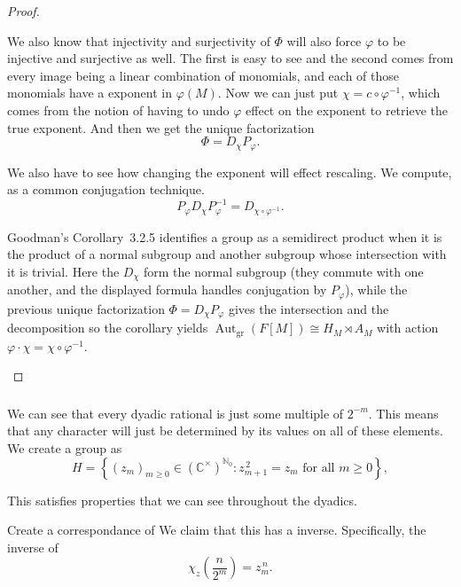 \documentclass[11pt]{scrartcl}
\begin{document}
\begin{soln}
\begin{proof}
\begin{subproof}
			We also know that injectivity and surjectivity of $\Phi$ will also force 
			$\varphi$ to be injective and surjective as well. The first is easy to see
			and the second comes from every image being a linear combination of monomials, and
			each of those monomials have a exponent in  $\varphi(M)$.
            Now we can just put
            $\chi=c\circ\varphi^{-1}$, which comes from the notion 
			of having to undo $\varphi$ effect on the exponent to retrieve 
			the true exponent. And then we get the unique factorization
            \[
            \Phi=D_\chi P_\varphi.
            \]
        \end{subproof}

        \begin{subproof}
			We also have to see how changing the exponent will effect rescaling. 
			We compute, as a common conjugation technique.
			            \[
            P_\varphi D_\chi P_\varphi^{-1}
            =D_{\chi\circ\varphi^{-1}}.
            \]

Goodman's Corollary~3.2.5 \cite{p6-goodman} identifies a
group as a semidirect product when it is the product of
a normal subgroup and another subgroup whose intersection
with it is trivial.
Here the $D_\chi$ form the normal subgroup
(they commute with one another, and the displayed formula
handles conjugation by $P_\varphi$), while the previous
unique factorization $\Phi=D_\chi P_\varphi$ gives the intersection and the decomposition
so  the corollary yields
$\operatorname{Aut}_{\mathrm{gr}}(F[M])\cong H_M\rtimes A_M$
with action $\varphi\cdot\chi=\chi\circ\varphi^{-1}$.
        \end{subproof}
    \end{proof}

    \subsubsection*{}
	We can see that every dyadic rational is just some multiple of  $2^{-m}$.
	This means that any character will just be determined by its values on
	all of these elements. We create a group as 
	    \[
    H=\left\{
        (z_m)_{m\ge0}\in(\mathbb C^\times)^{\mathbb N_0}:
        z_{m+1}^{\,2}=z_m\text{ for all }m\ge0
    \right\},
    \]

	This satisfies properties that we can see throughout the dyadics.

    \begin{claim*}
        Create a correspondance of 
        We claim that this has a inverse. Specifically, the inverse of 
        \[
        \chi_z\!\left(\frac{n}{2^m}\right)=z_m^{\,n}.
        \]
    \end{claim*}


\end{soln}
\end{document}
